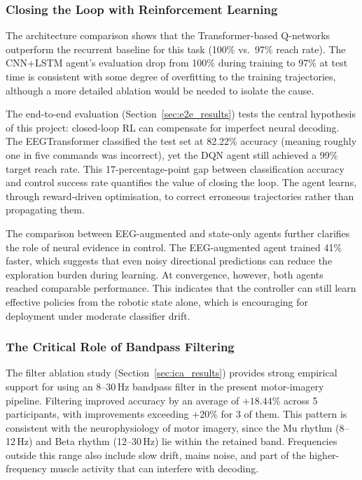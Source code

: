 \documentclass[12pt, a4paper]{article}
\begin{document}
\subsubsection{Closing the Loop with Reinforcement Learning}

The architecture comparison shows that the Transformer-based Q-networks outperform the recurrent baseline for this task (100\% vs.~97\% reach rate). The CNN+LSTM agent's evaluation drop from 100\% during training to 97\% at test time is consistent with some degree of overfitting to the training trajectories, although a more detailed ablation would be needed to isolate the cause.

The end-to-end evaluation (Section~\ref{sec:e2e_results}) tests the central hypothesis of this project: closed-loop RL can compensate for imperfect neural decoding. The EEGTransformer classified the test set at 82.22\% accuracy (meaning roughly one in five commands was incorrect), yet the DQN agent still achieved a 99\% target reach rate. This 17-percentage-point gap between classification accuracy and control success rate quantifies the value of closing the loop. The agent learns, through reward-driven optimisation, to correct erroneous trajectories rather than propagating them.

The comparison between EEG-augmented and state-only agents further clarifies the role of neural evidence in control. The EEG-augmented agent trained 41\% faster, which suggests that even noisy directional predictions can reduce the exploration burden during learning. At convergence, however, both agents reached comparable performance. This indicates that the controller can still learn effective policies from the robotic state alone, which is encouraging for deployment under moderate classifier drift.

\subsubsection{The Critical Role of Bandpass Filtering}

The filter ablation study (Section~\ref{sec:ica_results}) provides strong empirical support for using an 8--30\,Hz bandpass filter in the present motor-imagery pipeline. Filtering improved accuracy by an average of $+18.44\%$ across 5 participants, with improvements exceeding $+20\%$ for 3 of them. This pattern is consistent with the neurophysiology of motor imagery, since the Mu rhythm (8--12\,Hz) and Beta rhythm (12--30\,Hz) lie within the retained band. Frequencies outside this range also include slow drift, mains noise, and part of the higher-frequency muscle activity that can interfere with decoding.
\end{document}

